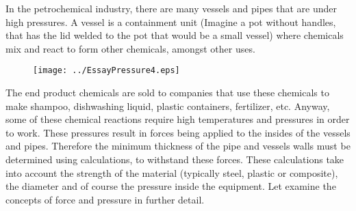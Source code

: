 In the petrochemical industry, there are many vessels and pipes that
are under high pressures. A vessel is a containment unit (Imagine a
pot without handles, that has the lid welded to the pot  that would
be a small vessel) where chemicals mix and react to form other
chemicals, amongst other uses.
\begin{figure}[H]
\centering
\texttt{[image: ../EssayPressure4.eps]}
\end{figure}

The end product chemicals are sold to companies that use these
chemicals to make shampoo, dishwashing liquid, plastic containers,
fertilizer, etc. Anyway, some of these chemical reactions require
high temperatures and pressures in order to work. These pressures
result in forces being applied to the insides of the vessels and
pipes. Therefore the minimum thickness of the pipe and vessels walls
must be determined using calculations, to withstand these forces.
These calculations take into account the strength of the material
(typically steel, plastic or composite), the diameter and of course
the pressure inside the equipment. Let examine the concepts of
force and pressure in further detail.

